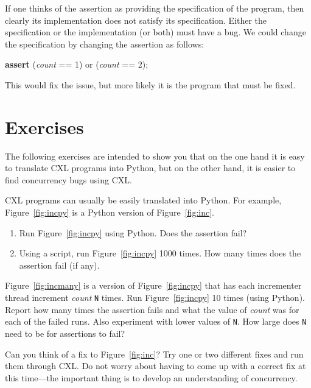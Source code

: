 \documentclass{report}
\newenvironment{code}{
\tcolorbox
}{
\endtcolorbox
}
\begin{document}

If one thinks of the assertion as providing the specification of the
program, then clearly its implementation does not satisfy its specification.
Either the specification or the implementation (or both) must have a bug.
We could change the specification by changing the assertion as follows:

\begin{code}
\textbf{assert} (\textit{count} == 1) or (\textit{count} == 2);
\end{code}

This would fix the issue, but more likely it is the program that must
be fixed.

\section*{Exercises}

The following exercises are intended to show you that on the one hand it
is easy to translate CXL programs into Python, but on the other hand,
it is easier to find concurrency bugs using CXL.

\begin{problems}
\item CXL programs can usually be easily translated into Python.  For example,
Figure~\ref{fig:incpy} is a Python version of Figure~\ref{fig:inc}.
\begin{enumerate}
\item Run Figure~\ref{fig:incpy} using Python.  Does the assertion fail?
\item Using a script, run Figure~\ref{fig:incpy} 1000 times.  How many times does the assertion
fail (if any).
\end{enumerate}
\item Figure~\ref{fig:incmany} is a version of Figure~\ref{fig:incpy} that has each
incrementer thread increment \textit{count} \texttt{N} times.  Run Figure~\ref{fig:incpy}
10 times (using Python).
Report how many times the assertion fails and what the value of \textit{count}
was for each of the failed runs.
Also experiment with lower values of \texttt{N}.
How large does \texttt{N} need to be for assertions to fail?
\item Can you think of a fix to Figure~\ref{fig:inc}?  Try one or two different fixes
and run them through CXL.  Do not worry about having to come up with a correct fix at this
time---the important thing is to develop an understanding of concurrency.
\end{problems}
\end{document}
